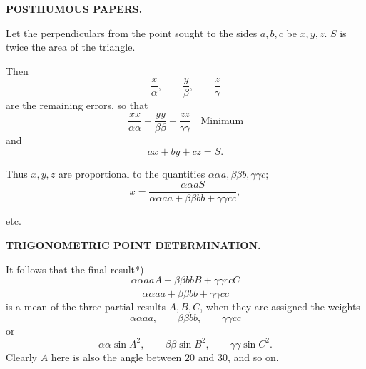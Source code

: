 \par\clearpage
\noindent{}\hfill{\small\textbf{POSTHUMOUS PAPERS.}}\hfill\null\par\medskip

Let the perpendiculars from the point sought to the sides \(a,b,c\) be \(x,y,z\). \(S\) is twice the area of the triangle.

Then
\[
 \frac{x}{\alpha},\qquad \frac{y}{\beta},\qquad \frac{z}{\gamma}
\]
\noindent are the remaining errors, so that
\[
 \frac{xx}{\alpha\alpha}+\frac{yy}{\beta\beta}+\frac{zz}{\gamma\gamma}
 \quad\text{Minimum}
\]
\noindent and
\[
 ax+by+cz=S.
\]

Thus \(x,y,z\) are proportional to the quantities \(\alpha\alpha a,\beta\beta b,\gamma\gamma c\);
\[
 x=\frac{\alpha\alpha aS}{\alpha\alpha aa+\beta\beta bb+\gamma\gamma cc},
\]
{\centering etc.\par}

\]

\par\clearpage
\noindent\null\hfill{\small\textbf{TRIGONOMETRIC POINT DETERMINATION.}}\hfill{}\par\medskip

It follows that the final result*)
\[
 \frac{\alpha\alpha aaA+\beta\beta bbB+\gamma\gamma ccC}
      {\alpha\alpha aa+\beta\beta bb+\gamma\gamma cc}
\]
\noindent is a mean of the three partial results \(A,B,C\), when they are assigned the weights
\[
 \alpha\alpha aa,\qquad \beta\beta bb,\qquad \gamma\gamma cc
\]
\noindent or
\[
 \alpha\alpha\sin A^2,\qquad
 \beta\beta\sin B^2,\qquad
 \gamma\gamma\sin C^2.
\]
Clearly \(A\) here is also the angle between \(20\) and \(30\), and so on.


